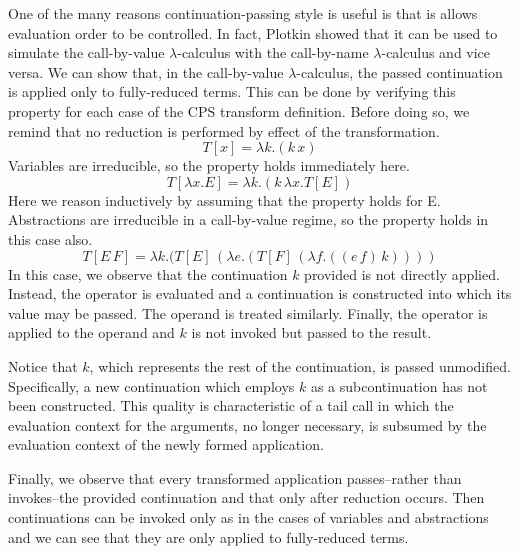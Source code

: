 \documentclass[ms,electronic,twosidetoc,letterpaper,chaptercenter,parttop]{byumsphd}
\begin{document}
One of the many reasons continuation-passing style is useful is that is allows evaluation
order to be controlled. In fact, Plotkin \cite{plotkin1975call} showed that it can be used
to simulate the call-by-value $\lambda$-calculus with the call-by-name $\lambda$-calculus
and vice versa. We can show that, in the call-by-value $\lambda$-calculus, the passed
continuation is applied only to fully-reduced terms. This can be done by verifying this
property for each case of the CPS transform definition. Before doing so, we remind that no
reduction is performed by effect of the transformation.
\[
T[x]=\lambda k.(k\,x)
\]
Variables are irreducible, so the property holds immediately here.
\[
T[\lambda x.E]=\lambda k.(k\,\lambda x.T[E])
\]
Here we reason inductively by assuming that the property holds for E. Abstractions are
irreducible in a call-by-value regime, so the property holds in this case also.
\[
T[E\,F]=\lambda k.(T[E]\,(\lambda e.(T[F]\,(\lambda f.((e\,f)\,k))))
\]
In this case, we observe that the continuation $k$ provided is not directly applied.
Instead, the operator is evaluated and a continuation is constructed into which its value
may be passed. The operand is treated similarly. Finally, the operator is applied to the
operand and $k$ is not invoked but passed to the result.

Notice that $k$, which represents the rest of the continuation, is passed unmodified.
Specifically, a new continuation which employs $k$ as a subcontinuation has not been
constructed. This quality is characteristic of a tail call in which the evaluation context
for the arguments, no longer necessary, is subsumed by the evaluation context of the newly
formed application.

Finally, we observe that every transformed application passes--rather than invokes--the
provided continuation and that only after reduction occurs. Then continuations can be
invoked only as in the cases of variables and abstractions and we can see that they are 
only applied to fully-reduced terms.




\end{document}
